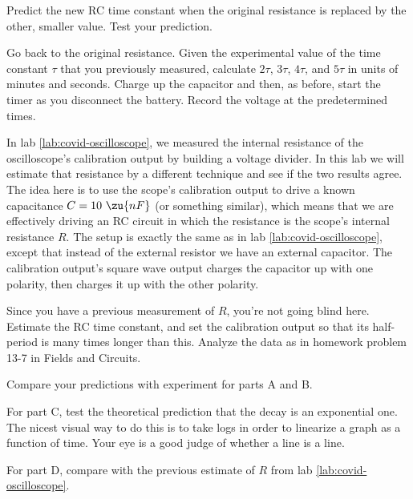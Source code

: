
Predict the new RC time constant when the original resistance is
replaced by the other, smaller value. Test your prediction.


Go back to the original resistance. Given the experimental value of
the time constant $\tau$ that you previously measured, calculate
$2\tau$, $3\tau$, $4\tau$, and $5\tau$ in units of minutes and seconds.
Charge up the capacitor and then, as before, start the timer as you
disconnect the battery. Record the voltage at the predetermined times.


In lab \ref{lab:covid-oscilloscope}, we measured the internal resistance of
the oscilloscope's calibration output by building a voltage divider. In this
lab we will estimate that resistance by a different technique and see if the
two results agree. The idea here is to use the scope's calibration output to
drive a known capacitance $C=10\ \zu{nF}$ (or something similar), which means that
we are effectively driving an RC circuit in which the resistance is the scope's
internal resistance $R$. The setup is exactly the same as in lab \ref{lab:covid-oscilloscope},
except that instead of the external resistor we have an external capacitor.
The calibration output's square wave output charges
the capacitor up with one polarity, then charges it up with the other polarity.

Since you have a previous measurement of $R$, you're not going blind here.
Estimate the RC time constant, and set the calibration output so that its half-period
is many times longer than this. Analyze the data as in homework problem 13-7
in Fields and Circuits.



\analysis

Compare your predictions with experiment for parts A and B.

For part C, test the theoretical prediction that the decay is
an exponential one. The nicest visual way to do this is to take
logs in order to linearize a graph as a function of time. Your
eye is a good judge of whether a line is a line.

For part D, compare with the previous estimate of $R$ from lab \ref{lab:covid-oscilloscope}.
